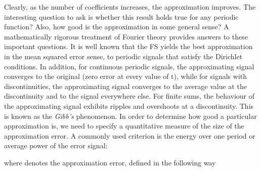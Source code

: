 \documentclass{article}
\begin{document}
\begin{CellGroup}
\begin{CellGroup}
\end{CellGroup}
Clearly, as the number of coefficients increases, the approximation improves. The interesting question to ask is whether this result holds true for
any periodic function? Also, how good is the approximation in some general sense? A mathematically rigorous treatment of Fourier theory provides
answers to these important questions. It is well known that the FS yields the best approximation in the mean squared error sense, to periodic signals
that satisfy the Dirichlet conditions. In addition, for continuous periodic signals, the approximating signal converges to the original (zero error
at every value of t), while for signals with discontinuities, the approximating signal converges to the average value at the discontinuity and to
the signal everywhere else. For finite sums, the behaviour of the approximating signal exhibits ripples and overshoots at a discontinuity. This is
known as the {\itshape Gibb's} phenomenon.  In order to determine how good a particular approximation is, we need to specify a quantitative measure
of the size of the approximation error. A commonly used criterion is the energy over one period or average power of the error signal:




where  denotes the approximation error, defined in the following way




\begin{CellGroup}



\end{CellGroup}

\end{CellGroup}
\end{document}
